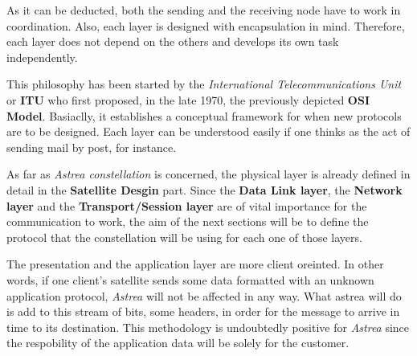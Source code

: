 As it can be deducted, both the sending and the receiving node have to work in coordination. Also, each layer is designed with encapsulation in mind. Therefore, each layer does not depend on the others and develops its own task independently.

This philosophy has been started by the \textit{International Telecommunications Unit} or \textbf{ITU} who first proposed, in the late 1970, the previously depicted \textbf{OSI Model}. Basiaclly, it establishes a conceptual framework for when new protocols are to be designed. Each layer can be understood easily if one thinks as the act of sending mail by post, for instance.

As far as \textit{Astrea constellation} is concerned, the physical layer is already defined in detail in the \textbf{Satellite Desgin} part. Since the\textbf{ Data Link layer}, the \textbf{Network layer} and the \textbf{Transport/Session layer} are of vital importance for the communication to work, the aim of the next sections will be to define the protocol that the constellation will be using for each one of those layers.

The presentation and the application layer are more client oreinted. In other words, if one client's satellite sends some data formatted with an unknown application protocol, \textit{Astrea} will not be affected in any way. What astrea will do is add to this stream of bits, some headers, in order for the message to arrive in time to its destination. This methodology is undoubtedly positive for \textit{Astrea} since the respobility of the application data will be solely for the customer.